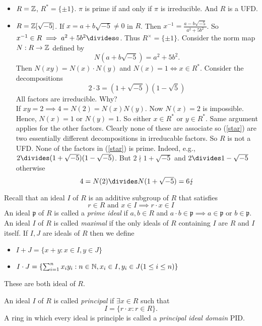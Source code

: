 \documentclass[NumTh.tex]{subfiles}
\begin{document}
\begin{ex}
  \begin{itemize}
    \item $R = \mathbb{Z}$, $R^\ast = \{\pm 1\}$. $\pi$ is prime if and only if $\pi$ is irreducible.
    And $R$ is a UFD.
    \item $R = \mathbb{Z}[\sqrt{-5}]$. If $x = a + b \sqrt{-5} \neq 0$ in $R$.
    Then $x^{-1} = \frac{a -b \sqrt{-5}}{a^2 + 5 b^2}$.
    So $x^{-1} \in R \implies a^2 + 5b^2 \divides a$.
    Thus $R^\times = \{ \pm 1\}$.
    Consider the norm map $N: R \to \mathbb{Z}$ defined by
    \[ N(a+b\sqrt{-5}) = a^2 + 5 b^2 \text{.} \]
    Then $N(xy) = N(x) \cdot N(y)$ and $N(x) = 1 \iff x \in R^\ast$.
    Consider the decompositions
    \[ 2 \cdot 3 = (1 + \sqrt{-5}) (1 - \sqrt{5}) \label{star}\] 
    All factors are irreducible. Why?\\
    If $xy = 2 \implies 4 = N(2) = N(x) N(y)$.
    Now $N(x) = 2$ is impossible. Hence, $N(x) = 1$ or $N(y) = 1$.
    So either $x \in R^\ast$ or $y \in R^\ast$. Same argument applies for the other factors.
    Clearly none of these are associate so (\ref{star}) are two essentially different decompositions in irreducable factors.
    So $R$ is not a UFD. None of the factors in (\ref{star}) is prime.
    Indeed, e.g., $2 \divides (1 + \sqrt{-5})(1- \sqrt{-5})$.
    But $2 \nmid 1 + \sqrt{-5}$ and $2 \divides 1- \sqrt{-5}$ otherwise
    \[ 4 = N(2) \divides N(1+\sqrt{-5}) = 6 \lightning\]
  \end{itemize}
\end{ex}

Recall that an ideal $I$ of $R$ is an additive subgroup of $R$ that satisfies
\[ r \in R \text{ and } x \in I \implies r \cdot x \in I \]
An ideal $\mathfrak{p}$ of $R$ is called a \emph{prime ideal} if $a,b \in R$ and $a \cdot b \in \mathfrak{p} \implies a \in \mathfrak{p}$ or $b \in \mathfrak{p}$.
An ideal $I$ of $R$ is called \emph{maximal} if the only ideals of $R$ containing $I$ are $R$ and $I$ itself.
If $I,J$ are ideals of $R$ then we define
\begin{itemize}
  \item $I + J = \{ x+y : x \in I, y \in J \}$
  \item $I \cdot J = \{ \sum_{i=1}^n x_i y_i : n \in \mathbb{N}, x_i \in I, y_i \in J (1 \leq i \leq n) \}$
\end{itemize}
These are both ideal of $R$.

An ideal $I$ of $R$ is called \emph{principal} if $\exists x \in R$ such that
\[ I = \{ r \cdot x : r \in R \} \text{.} \]
A ring in which every ideal is principle is called a \emph{principal ideal domain} PID.
\end{document}
